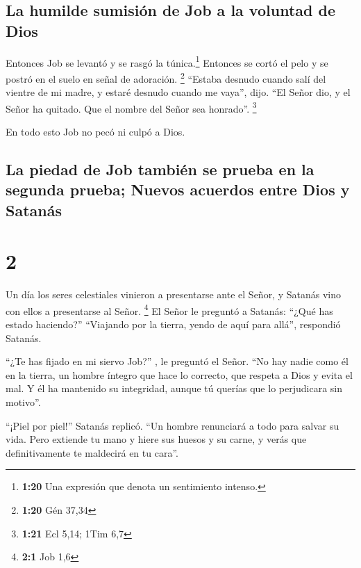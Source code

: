 \hypertarget{la-humilde-sumisiuxf3n-de-job-a-la-voluntad-de-dios}{%
\subsection{La humilde sumisión de Job a la voluntad de
Dios}\label{la-humilde-sumisiuxf3n-de-job-a-la-voluntad-de-dios}}

 Entonces Job se levantó y se rasgó la túnica.\footnote{\textbf{1:20}
  Una expresión que denota un sentimiento intenso.} Entonces se cortó el
pelo y se postró en el suelo en señal de adoración. \footnote{\textbf{1:20}
  Gén 37,34}  ``Estaba desnudo cuando salí del vientre de
mi madre, y estaré desnudo cuando me vaya'', dijo. ``El Señor dio, y el
Señor ha quitado. Que el nombre del Señor sea honrado''. \footnote{\textbf{1:21}
  Ecl 5,14; 1Tim 6,7}

 En todo esto Job no pecó ni culpó a Dios.

\hypertarget{la-piedad-de-job-tambiuxe9n-se-prueba-en-la-segunda-prueba-nuevos-acuerdos-entre-dios-y-satanuxe1s}{%
\subsection{La piedad de Job también se prueba en la segunda prueba;
Nuevos acuerdos entre Dios y
Satanás}\label{la-piedad-de-job-tambiuxe9n-se-prueba-en-la-segunda-prueba-nuevos-acuerdos-entre-dios-y-satanuxe1s}}

\hypertarget{section-1}{%
\section{2}\label{section-1}}

 Un día los seres celestiales vinieron a presentarse ante
el Señor, y Satanás vino con ellos a presentarse al Señor. \footnote{\textbf{2:1}
  Job 1,6}  El Señor le preguntó a Satanás: ``¿Qué has
estado haciendo?'' ``Viajando por la tierra, yendo de aquí para allá'',
respondió Satanás.

 ``¿Te has fijado en mi siervo Job?'' , le preguntó el
Señor. ``No hay nadie como él en la tierra, un hombre íntegro que hace
lo correcto, que respeta a Dios y evita el mal. Y él ha mantenido su
integridad, aunque tú querías que lo perjudicara sin motivo''.

 ``¡Piel por piel!'' Satanás replicó. ``Un hombre
renunciará a todo para salvar su vida.  Pero extiende tu
mano y hiere sus huesos y su carne, y verás que definitivamente te
maldecirá en tu cara''.

